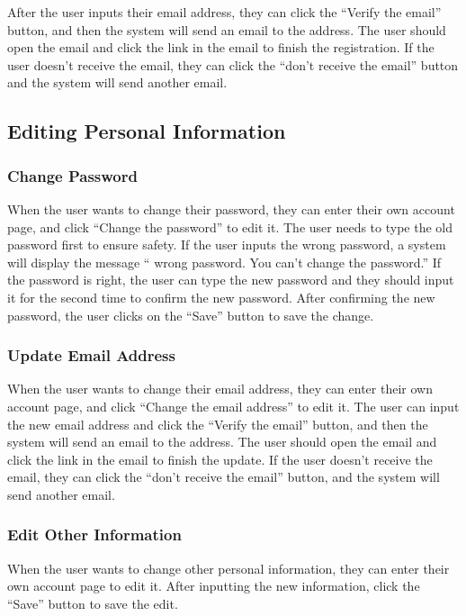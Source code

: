 \documentclass[conference]{IEEEtran}
\begin{document}
After the user inputs their email address, they can click the “Verify the 
email” button, and then the system will send an email to the address. The user
should open the email and click the link in the email to finish the registration. If 
the user doesn't receive the email, they can click the “don’t receive the email” 
button and the system will send another email.

\subsection{ Editing Personal Information }

\subsubsection{ Change Password }

When the user wants to change their password, they can enter their 
own account page, and click “Change the password” to edit it. The user needs to 
type the old password first to ensure safety. If the user inputs the wrong 
password, a system will display the message “ wrong password. You can’t 
change the password.” If the password is right, the user can type the new 
password and they should input it for the second time to confirm the new
password. After confirming the new password, the user clicks on the “Save”
button to save the change.

\subsubsection{ Update Email Address }

When the user wants to change their email address, they can enter their 
own account page, and click “Change the email address” to edit it. The user can 
input the new email address and click the “Verify the email” button, and then the 
system will send an email to the address. The user should open the email and 
click the link in the email to finish the update. If the user doesn't receive the 
email, they can click the “don’t receive the email” button, and the system will 
send another email.

\subsubsection{ Edit Other Information }

When the user wants to change other personal information, they can 
enter their own account page to edit it. After inputting the new information, click 
the “Save” button to save the edit.
\end{document}
